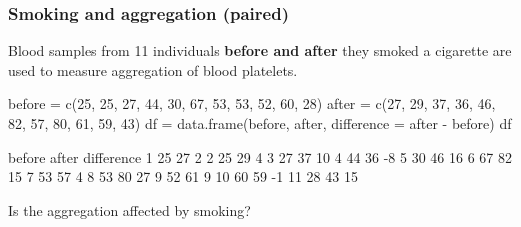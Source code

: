 \documentclass[a4paper]{article}\usepackage[]{graphicx}\usepackage[]{xcolor}
\begin{document}
\subsubsection{Smoking and aggregation (paired)}
Blood samples from 11 individuals \textbf{\textcolor{myred}{before and after}} they smoked a cigarette are used to measure aggregation of blood platelets.
\begin{Schunk}
\begin{Sinput}
before = c(25, 25, 27, 44, 30, 67, 53, 53, 52, 60, 28)
after =  c(27, 29, 37, 36, 46, 82, 57, 80, 61, 59, 43)
df = data.frame(before, after, difference = after - before)
df
\end{Sinput}
\begin{Soutput}
   before after difference
1      25    27          2
2      25    29          4
3      27    37         10
4      44    36         -8
5      30    46         16
6      67    82         15
7      53    57          4
8      53    80         27
9      52    61          9
10     60    59         -1
11     28    43         15
\end{Soutput}
\end{Schunk}
Is the aggregation affected by smoking?
\end{document}
